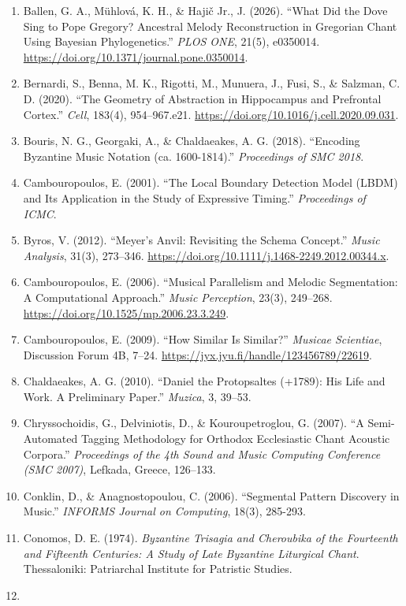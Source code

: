 \documentclass[11pt,a4paper]{article}
\begin{document}
\begin{enumerate}
\item
 Ballen, G. A., Mühlová, K. H., \& Hajič Jr., J. (2026). ``What Did the Dove Sing to Pope Gregory? Ancestral Melody Reconstruction in Gregorian Chant Using Bayesian Phylogenetics.'' \emph{PLOS ONE}, 21(5), e0350014. \url{https://doi.org/10.1371/journal.pone.0350014}.
\item
 Bernardi, S., Benna, M. K., Rigotti, M., Munuera, J., Fusi, S., \& Salzman, C. D. (2020). ``The Geometry of Abstraction in Hippocampus and Prefrontal Cortex.'' \emph{Cell}, 183(4), 954--967.e21. \url{https://doi.org/10.1016/j.cell.2020.09.031}.
\item
 Bouris, N. G., Georgaki, A., \& Chaldaeakes, A. G. (2018). ``Encoding Byzantine Music Notation (ca. 1600-1814).'' \emph{Proceedings of SMC 2018}.
\item
 Cambouropoulos, E. (2001). ``The Local Boundary Detection Model (LBDM) and Its Application in the Study of Expressive Timing.'' \emph{Proceedings of ICMC}.
\item
 Byros, V. (2012). ``Meyer's Anvil: Revisiting the Schema Concept.'' \emph{Music Analysis}, 31(3), 273--346. \url{https://doi.org/10.1111/j.1468-2249.2012.00344.x}.
\item
 Cambouropoulos, E. (2006). ``Musical Parallelism and Melodic Segmentation: A Computational Approach.'' \emph{Music Perception}, 23(3), 249--268. \url{https://doi.org/10.1525/mp.2006.23.3.249}.
\item
 Cambouropoulos, E. (2009). ``How Similar Is Similar?'' \emph{Musicae Scientiae}, Discussion Forum 4B, 7--24. \url{https://jyx.jyu.fi/handle/123456789/22619}.
\item
 Chaldaeakes, A. G. (2010). ``Daniel the Protopsaltes (+1789): His Life and Work. A Preliminary Paper.'' \emph{Muzica}, 3, 39--53.
\item
 Chryssochoidis, G., Delviniotis, D., \& Kouroupetroglou, G. (2007). ``A Semi-Automated Tagging Methodology for Orthodox Ecclesiastic Chant Acoustic Corpora.'' \emph{Proceedings of the 4th Sound and Music Computing Conference (SMC 2007)}, Lefkada, Greece, 126--133.
\item
 Conklin, D., \& Anagnostopoulou, C. (2006). ``Segmental Pattern Discovery in Music.'' \emph{INFORMS Journal on Computing}, 18(3), 285-293.
\item
 Conomos, D. E. (1974). \emph{Byzantine Trisagia and Cheroubika of the Fourteenth and Fifteenth Centuries: A Study of Late Byzantine Liturgical Chant}. Thessaloniki: Patriarchal Institute for Patristic Studies.
\item

\end{enumerate}
\end{document}
